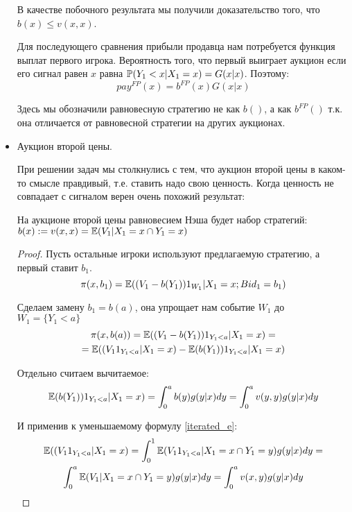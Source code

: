 \begin{itemize}
В качестве побочного результата мы получили доказательство того, что $ b(x)\leq v(x,x) $.

Для последующего сравнения прибыли продавца нам потребуется функция выплат первого игрока. Вероятность того, что первый выиграет аукцион если его сигнал равен $ x $ равна $ \P(Y_{1}<x|X_{1}=x)=G(x|x)$. Поэтому:
\begin{equation}
pay^{FP}(x)=b^{FP}(x)G(x|x)
\end{equation}

Здесь мы обозначили равновесную стратегию не как $ b() $, а как $ b^{FP}() $ т.к. она отличается от равновесной стратегии на других аукционах.

\item Аукцион второй цены.

При решении задач мы столкнулись с тем, что аукцион второй цены в каком-то смысле правдивый, т.е. ставить надо свою ценность. Когда ценность не совпадает с сигналом верен очень похожий результат:

\begin{myth} \label{NE_SP}
На аукционе второй цены равновесием Нэша будет набор стратегий: $ b(x):=v(x,x)=\E(V_{1}|X_{1}=x \cap Y_{1}=x) $
\end{myth}
\begin{proof}
Пусть остальные игроки используют предлагаемую стратегию, а первый ставит $ b_{1} $.
\begin{equation}
\pi(x,b_{1})=\E((V_{1}-b(Y_{1}))1_{W_{1}}|X_{1}=x; Bid_{1}=b_{1})
\end{equation}

Сделаем замену $ b_{1}=b(a) $, она упрощает нам событие $ W_{1} $ до $ W_{1}=\{Y_{1}<a\} $
\begin{multline}
\pi(x,b(a))=\E((V_{1}-b(Y_{1}))1_{Y_{1}<a}|X_{1}=x)=\\
=\E((V_{1}1_{Y_{1}<a}|X_{1}=x)-\E(b(Y_{1}))1_{Y_{1}<a}|X_{1}=x)
\end{multline}

Отдельно считаем вычитаемое:
\begin{equation}
\E(b(Y_{1}))1_{Y_{1}<a}|X_{1}=x)=\int_{0}^{a}b(y)g(y|x)dy=\int_{0}^{a}v(y,y)g(y|x)dy
\end{equation}

И применив к уменьшаемому формулу \ref{iterated_e}:
\begin{multline}
\E((V_{1}1_{Y_{1}<a}|X_{1}=x)=\int_{0}^{1}\E(V_{1}1_{Y_{1}<a}|X_{1}=x \cap Y_{1}=y)g(y|x)dy=\\
\int_{0}^{a}\E(V_{1}|X_{1}=x \cap Y_{1}=y)g(y|x)dy=\int_{0}^{a}v(x,y)g(y|x)dy
\end{multline}



\end{proof}
\end{itemize}
